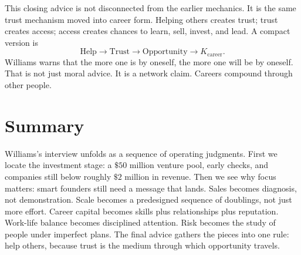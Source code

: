 This closing advice is not disconnected from the earlier mechanics. It is the same trust mechanism moved into career form. Helping others creates trust; trust creates access; access creates chances to learn, sell, invest, and lead. A compact version is
\begin{equation}
\mathrm{Help}
\longrightarrow
\mathrm{Trust}
\longrightarrow
\mathrm{Opportunity}
\longrightarrow
K_{\mathrm{career}}.
\end{equation}
Williams warns that the more one is by oneself, the more one will be by oneself. That is not just moral advice. It is a network claim. Careers compound through other people.

\section{Summary}

Williams's interview unfolds as a sequence of operating judgments. First we locate the investment stage: a \(\$50\) million venture pool, early checks, and companies still below roughly \(\$2\) million in revenue. Then we see why focus matters: smart founders still need a message that lands. Sales becomes diagnosis, not demonstration. Scale becomes a predesigned sequence of doublings, not just more effort. Career capital becomes skills plus relationships plus reputation. Work-life balance becomes disciplined attention. Risk becomes the study of people under imperfect plans. The final advice gathers the pieces into one rule: help others, because trust is the medium through which opportunity travels.